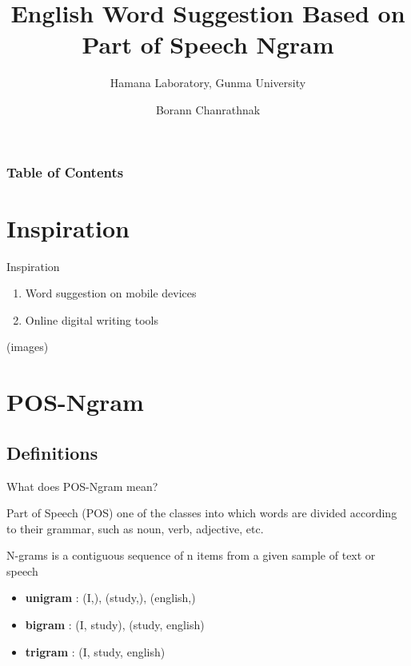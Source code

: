 \documentclass{beamer}
\title{English Word Suggestion Based on Part of Speech Ngram}
\subtitle{Hamana Laboratory, Gunma University}
\author{Borann Chanrathnak}
\begin{document}
\maketitle


\begin{frame}
\frametitle{Table of Contents}
\tableofcontents
\end{frame}

\section{Inspiration}
\begin{frame}{Inspiration}
    \begin{enumerate}
        \item Word suggestion on mobile devices
        \item Online digital writing tools
    \end{enumerate}
    (images)
\end{frame}

\section{POS-Ngram}
\subsection{Definitions}

\begin{frame}{What does POS-Ngram mean?}
    \begin{definition}{Part of Speech (POS)}
        one of the classes into which words are divided according to their grammar,
        such as noun, verb, adjective, etc.
    \end{definition}
    \begin{definition}{N-grams}
        is a contiguous sequence of n items from a given sample of text or speech
        \begin{itemize}
            \item \textbf{unigram} : (I,), (study,), (english,)
            \item \textbf{bigram} : (I, study), (study, english) 
            \item \textbf{trigram} : (I, study, english)
        \end{itemize}
    \end{definition}
\end{frame}
\end{document}
